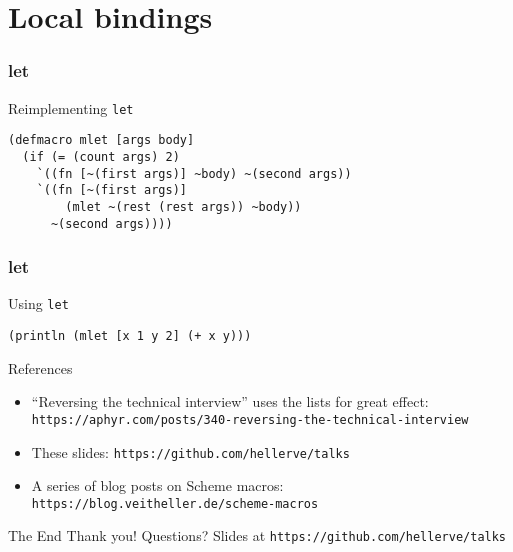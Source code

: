 \documentclass[aspectratio=169]{beamer}
\begin{document}
  \section{Local bindings}
  \begin{frame}[fragile]
    \frametitle{let}
    \begin{listing}[H]
      \caption{Reimplementing \texttt{let}}
      \begin{verbatim}
(defmacro mlet [args body]
  (if (= (count args) 2)
    `((fn [~(first args)] ~body) ~(second args))
    `((fn [~(first args)]
        (mlet ~(rest (rest args)) ~body))
      ~(second args))))
      \end{verbatim}
    \end{listing}
  \end{frame}
  \begin{frame}[fragile]
    \frametitle{let}
    \begin{listing}[H]
      \caption{Using \texttt{let}}
      \begin{verbatim}
(println (mlet [x 1 y 2] (+ x y)))
      \end{verbatim}
    \end{listing}
  \end{frame}
  \begin{frame}{References}
    \begin{itemize}
      \item “Reversing the technical interview” uses the lists for great effect: \texttt{https://aphyr.com/posts/340-reversing-the-technical-interview}
      \item These slides: \texttt{https://github.com/hellerve/talks}
      \item A series of blog posts on Scheme macros: \texttt{https://blog.veitheller.de/scheme-macros}
    \end{itemize}
  \end{frame}
  \begin{frame}{The End}
    \Huge Thank you!
    \linebreak
    \linebreak
    \linebreak
    \small Questions?
    \linebreak
    \linebreak
    \tiny Slides at \texttt{https://github.com/hellerve/talks}
  \end{frame}
\end{document}
